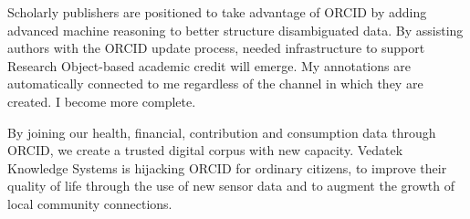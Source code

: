 \documentclass[a4paper,USenglish]{dagrep}
\begin{document}
Scholarly publishers are positioned to take advantage of ORCID by adding 
advanced machine reasoning to better structure disambiguated data.  By 
assisting authors with the ORCID update process, needed infrastructure to 
support Research Object-based academic credit will emerge.  My annotations are 
automatically connected to me regardless of the channel in which they are 
created.  I become more complete.

By joining our health, financial, contribution and consumption data through 
ORCID, we create a trusted digital corpus with new capacity.  Vedatek Knowledge 
Systems is hijacking ORCID for ordinary citizens, to improve their quality of life 
through the use of new sensor data and to augment the growth of local 
community connections. 

 
\end{document}
